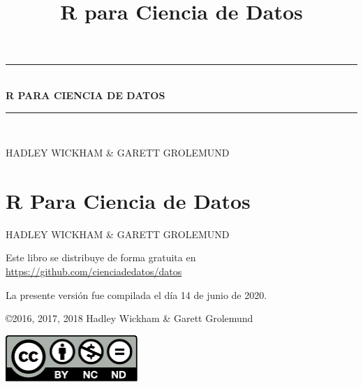 \documentclass[11pt,oneside]{report}
\title{R para Ciencia de Datos}
\author{}
\date{\vspace{-2.5em}}
\begin{document}
\maketitle


\begin{center} \end{center}

\cleardoublepage

\newcommand{\HRule}{\rule{\linewidth}{0.5mm}}
\begin{titlepage}
{\sffamily 
    \begin{center}
        \vspace*{\fill}
        \rule{\linewidth}{0.5mm}\\[0.4cm]{
        \huge \bfseries R PARA CIENCIA DE DATOS}\\ [0.4cm]
        \rule{\linewidth}{0.5mm}\\[1.5cm]
        \begin{minipage}{0.9\textwidth}
        \begin{center}
        \large
        HADLEY WICKHAM \& GARETT GROLEMUND
        \end{center}
        \end{minipage}
    \vfill
    \end{center}}
\end{titlepage}
\setcounter{page}{2}

\setlength\parindent{0pt}

\renewcommand{\labelenumi}{\alph{enumi}.}

\newpage

\chapter*{R Para Ciencia de Datos}

HADLEY WICKHAM \& GARETT GROLEMUND

Este libro se distribuye de forma gratuita en
\href{https://github.com/cienciadedatos/datos}{https://github.com/cienciadedatos/datos}

La presente versión fue compilada el día 14 de junio de 2020.

\copyright 2016, 2017, 2018 Hadley Wickham \& Garett Grolemund

\vfill

\begin{center}
\includegraphics[width=5cm]{by-nc-nd.pdf}
\end{center}
\end{document}
